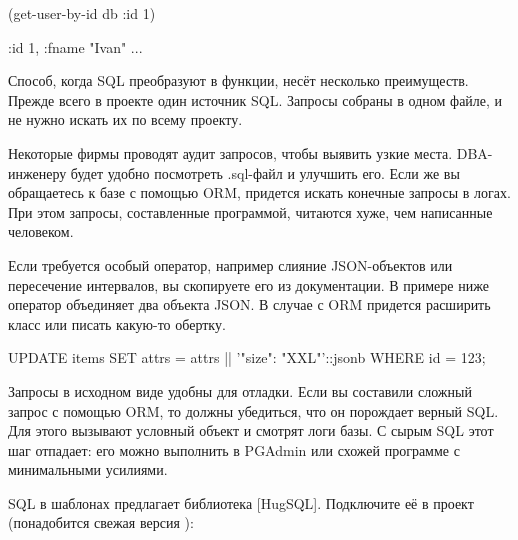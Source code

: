 \begin{english}
  \begin{clojure}
(get-user-by-id db {:id 1})

{:id 1, :fname "Ivan" ...}
  \end{clojure}
\end{english}

Способ, когда SQL преобразуют в функции, несёт несколько преимуществ. Прежде всего в проекте один источник SQL. Запросы собраны в одном файле, и не нужно искать их по всему проекту.

Некоторые фирмы проводят аудит запросов, чтобы выявить узкие места. DBA-инженеру будет удобно посмотреть .sql-файл и улучшить его. Если же вы обращаетесь к базе с помощью ORM, придется искать конечные запросы в логах. При этом запросы, составленные программой, читаются хуже, чем написанные человеком.

Если требуется особый оператор, например слияние JSON-объектов или пересечение интервалов, вы скопируете его из документации. В примере ниже оператор \code{||} объединяет два объекта JSON. В случае с ORM придется расширить класс или писать какую-то обертку.

\begin{english}
  \begin{sql}
UPDATE items
  SET attrs = attrs || '{"size": "XXL"}'::jsonb
  WHERE id = 123;
  \end{sql}
\end{english}

Запросы в исходном виде удобны для отладки. Если вы составили сложный запрос с помощью ORM, то должны убедиться, что он порождает верный SQL. Для этого вызывают условный объект  и смотрят логи базы. С сырым SQL этот шаг отпадает: его можно выполнить в PGAdmin или схожей программе с минимальными усилиями.


\def\urlhugsqlorg{https://www.hugsql.org/}
\def\urlhugsqlgh{https://github.com/layerware/hugsql}

SQL в шаблонах предлагает библиотека \footurl{HugSQL}{\urlhugsqlorg}[HugSQL]. Подключите её в проект (понадобится свежая версия ):

\begin{english}
  \begin{clojure}
  \end{clojure}
\end{english}

